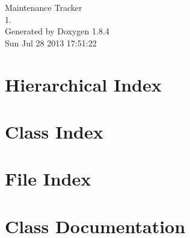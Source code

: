 \documentclass[twoside]{book}
\newcommand{\clearemptydoublepage}{%
  \newpage{\pagestyle{empty}\cleardoublepage}%
}
\begin{document}
\hypersetup{pageanchor=false}
\begin{titlepage}
\vspace*{7cm}
\begin{center}%
{\Large Maintenance Tracker \\[1ex]\large 1. }\\
\vspace*{1cm}
{\large Generated by Doxygen 1.8.4}\\
\vspace*{0.5cm}
{\small Sun Jul 28 2013 17:51:22}\\
\end{center}
\end{titlepage}
\clearemptydoublepage
\tableofcontents
\clearemptydoublepage
{}
\hypersetup{pageanchor=true}

\chapter{Hierarchical Index}

\chapter{Class Index}

\chapter{File Index}

\chapter{Class Documentation}
























\end{document}
